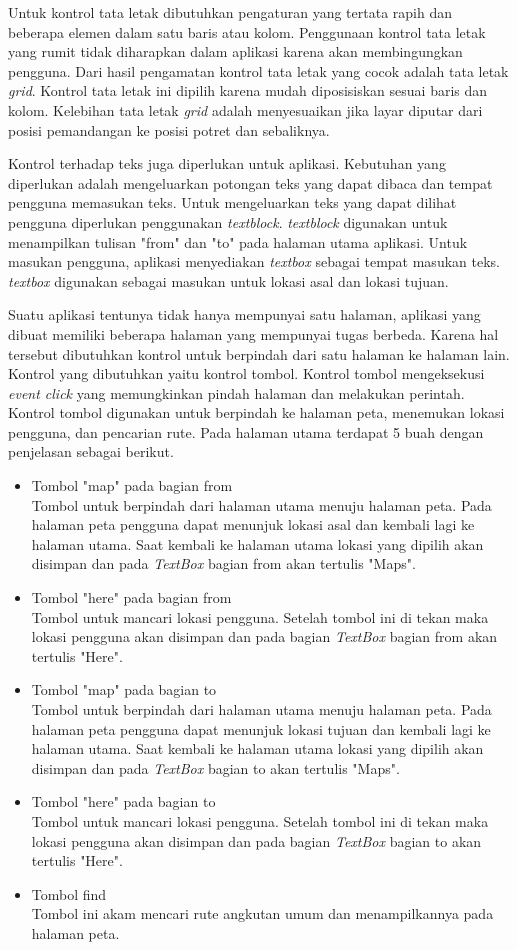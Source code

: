 Untuk kontrol tata letak dibutuhkan pengaturan yang tertata rapih dan beberapa elemen dalam satu baris atau kolom. Penggunaan kontrol tata letak yang rumit tidak diharapkan dalam aplikasi karena akan membingungkan pengguna. Dari hasil pengamatan kontrol tata letak yang cocok adalah tata letak \textit{grid}. Kontrol tata letak ini dipilih karena mudah diposisiskan sesuai baris dan kolom. Kelebihan tata letak \textit{grid} adalah menyesuaikan jika layar diputar dari posisi pemandangan ke posisi potret dan sebaliknya.

Kontrol terhadap teks juga diperlukan untuk aplikasi. Kebutuhan yang diperlukan adalah mengeluarkan potongan teks yang dapat dibaca dan tempat pengguna memasukan teks. Untuk mengeluarkan teks yang dapat dilihat pengguna diperlukan penggunakan \textit{textblock}. \textit{textblock} digunakan untuk menampilkan tulisan "from" dan "to" pada halaman utama aplikasi. Untuk masukan pengguna, aplikasi menyediakan \textit{textbox} sebagai tempat masukan teks. \textit{textbox} digunakan sebagai masukan untuk lokasi asal dan lokasi tujuan.

Suatu aplikasi tentunya tidak hanya mempunyai satu halaman, aplikasi yang dibuat memiliki beberapa halaman yang mempunyai tugas berbeda. Karena hal tersebut dibutuhkan kontrol untuk berpindah dari satu halaman ke halaman lain. Kontrol yang dibutuhkan yaitu kontrol tombol. Kontrol tombol mengeksekusi \textit{event click} yang memungkinkan pindah halaman dan melakukan perintah. Kontrol tombol digunakan untuk berpindah ke halaman peta, menemukan lokasi pengguna, dan pencarian rute. Pada halaman utama terdapat 5 buah dengan penjelasan sebagai berikut.
\begin{itemize}
	\item Tombol "map" pada bagian from\\
	Tombol untuk berpindah dari halaman utama menuju halaman peta. Pada halaman peta pengguna dapat menunjuk lokasi asal dan kembali lagi ke halaman utama. Saat kembali ke halaman utama lokasi yang dipilih akan disimpan dan pada \textit{TextBox} bagian from akan tertulis "Maps".
	\item Tombol "here" pada bagian from\\
	Tombol untuk mancari lokasi pengguna. Setelah tombol ini di tekan maka lokasi pengguna akan disimpan dan pada bagian \textit{TextBox} bagian from akan tertulis "Here".
	\item Tombol "map" pada bagian to\\
	Tombol untuk berpindah dari halaman utama menuju halaman peta. Pada halaman peta pengguna dapat menunjuk lokasi tujuan dan kembali lagi ke halaman utama. Saat kembali ke halaman utama lokasi yang dipilih akan disimpan dan pada \textit{TextBox} bagian to akan tertulis "Maps".
	\item Tombol "here" pada bagian to\\
	Tombol untuk mancari lokasi pengguna. Setelah tombol ini di tekan maka lokasi pengguna akan disimpan dan pada bagian \textit{TextBox} bagian to akan tertulis "Here".
	\item Tombol find\\
	Tombol ini akam mencari rute angkutan umum dan menampilkannya pada halaman peta.
\end{itemize}

